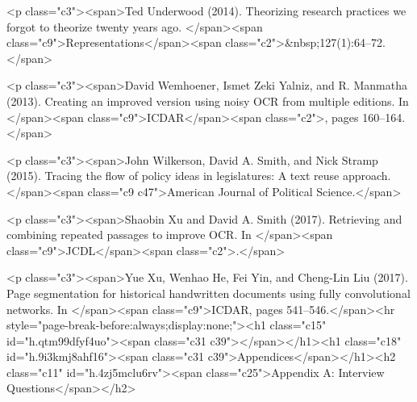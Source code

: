 \documentclass[twoside,11pt]{report}
\begin{document}
<p class="c3"><span>Ted Underwood (2014). Theorizing research practices we forgot to theorize twenty years ago. </span><span class="c9">Representations</span><span class="c2">&nbsp;127(1):64--72.</span>

<p class="c3"><span>David Wemhoener, Ismet Zeki Yalniz, and R. Manmatha (2013). Creating an improved version using noisy OCR from multiple editions. In </span><span class="c9">ICDAR</span><span class="c2">, pages 160--164.</span>

<p class="c3"><span>John Wilkerson, David A. Smith, and Nick Stramp (2015). Tracing the flow of policy ideas in legislatures: A text reuse approach. </span><span class="c9 c47">American Journal of Political Science.</span>

<p class="c3"><span>Shaobin Xu and David A. Smith (2017). Retrieving and combining repeated passages to improve OCR. In </span><span class="c9">JCDL</span><span class="c2">.</span>

<p class="c3"><span>Yue Xu, Wenhao He, Fei Yin, and Cheng-Lin Liu (2017). Page segmentation for historical handwritten documents using fully convolutional networks. In </span><span class="c9">ICDAR, pages 541--546.</span><hr style="page-break-before:always;display:none;"><h1 class="c15" id="h.qtm99dfyf4uo"><span class="c31 c39"></span></h1><h1 class="c18" id="h.9i3kmj8ahf16"><span class="c31 c39">Appendices</span></h1><h2 class="c11" id="h.4zj5mclu6rv"><span class="c25">Appendix A: Interview Questions</span></h2>
\end{document}
